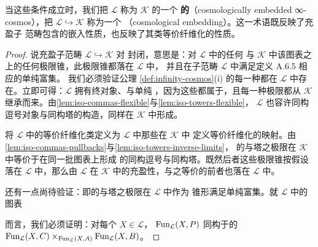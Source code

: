 当这些条件成立时，我们把 $\mathcal{L}$ 称为 $\mathcal{K}$ 的一个\textbf{%
\trCosmologicalEmbedding{}的\trInfinityCosmos}（cosmologically embedded
∞-cosmos），把 $\mathcal{L}\hookrightarrow\mathcal{K}$ 称为一个\textbf{%
\trCosmologicalEmbedding}（cosmological embedding）。这一术语既反映了充盈子
范畴包含的嵌入性质，也反映了其类等价纤维化的性质。

\begin{proof}
说充盈子范畴 $\mathcal{L}\hookrightarrow\mathcal{K}$ 对%
\trFlexibleWeightedLimit{}封闭，意思是：对 $\mathcal{L}$ 中的任何\trDiagram{}%
与 $\mathcal{K}$ 中该图表之上的任何极限锥，此极限锥都落在 $\mathcal{L}$ 中，
并且在子范畴 $\mathcal{L}$ 中满足定义 A.6.5 相应的单纯富集\trUniversalProperty{}。
我们必须验证公理 \cref{def:infinity-cosmos}(i) 的每一种\trLimit{}都在
$\mathcal{L}$ 中存在。立即可得：$\mathcal{L}$ 拥有终对象、\trProduct{}与单纯%
\trCotensor{}，因为这些都属于\trFlexibleWeightedLimit{}，且每一种极限都从
$\mathcal{K}$ 继承而来。由\cref{lem:iso-commas-flexible}与\ref{lem:iso-towers-flexible}，
$\mathcal{L}$ 也容许同构逗号对象与同构塔的构造，同样在 $\mathcal{K}$ 中形成。

将 $\mathcal{L}$ 中的等价纤维化类定义为 $\mathcal{L}$ 中那些在 $\mathcal{K}$ 中
定义等价纤维化的映射。由\cref{lem:iso-commas-pullbacks}与\ref{lem:iso-towers-inverse-limits}，
\trIsofibration{}的\trPullback{}与塔之极限在 $\mathcal{K}$ 中等价于在同一批图表上形成
的同构逗号与同构塔。既然后者这些极限锥按假设落在 $\mathcal{L}$ 中，那么由
$\mathcal{L}$ 在 $\mathcal{K}$ 中的充盈性，与之等价的前者也落在 $\mathcal{L}$ 中。

还有一点尚待验证：即\trIsofibration{}的\trPullback{}与塔之极限在 $\mathcal{L}$ 中作为
锥形\trLimit{}满足单纯富集\trUniversalProperty{}。就 $\mathcal{L}$ 中的\trPullback{}图表
\begin{center}
\end{center}
而言，我们必须证明：对每个 $X\in\mathcal{L}$，\trFunctorSpace{}
$\operatorname{Fun}_{\mathcal{L}}(X,P)$ 同构于\trFunctorSpace{}的\trPullback{}
$\operatorname{Fun}_{\mathcal{L}}(X,C)\times_{\operatorname{Fun}_{\mathcal{L}}(X,A)}\operatorname{Fun}_{\mathcal{L}}(X,B)$。


\end{proof}
